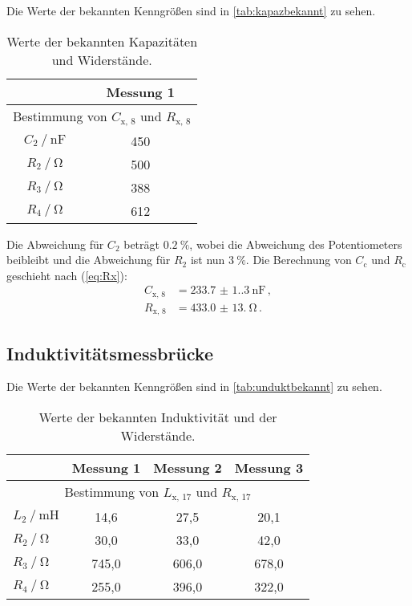 Die Werte der bekannten Kenngrößen sind in \autoref{tab:kapazbekannt} zu sehen.
\begin{table}
  \centering
  \caption{Werte der bekannten Kapazitäten und Widerstände.}
  \label{tab:kapazbekannt}
  \begin{tabular}{cc}
    \toprule
     & Messung 1  \\
    \midrule
    \multicolumn{2}{c}{ Bestimmung von $C_{\text{x, 8}}$ und $R_{\text{x, 8}}$ } \\
    $C_2 \mathbin{/} \unit{\nano\farad}$     & 450 \\
    $R_2 \mathbin{/} \unit{\ohm}$            & 500 \\
    $R_3 \mathbin{/} \unit{\ohm}$            & 388 \\
    $R_4 \mathbin{/} \unit{\ohm}$            & 612 \\
    \bottomrule
  \end{tabular}
\end{table}

Die Abweichung für $C_2$ beträgt $\qty{0.2}{\percent}$, wobei die Abweichung des Potentiometers beibleibt
und die Abweichung für $R_2$ ist nun $\qty{3}{\percent}$. 
Die Berechnung von $C_\text{c}$ und $R_\text{c}$ geschieht nach (\ref{eq:Rx}):
\begin{align*}
  C_\text{x, 8} &= \qty{233.7(1.3)}{\nano\farad} \, , \\
  R_\text{x, 8} &= \qty{433.0(13.0)}{\ohm} \, .
\end{align*}


\subsection{Induktivitätsmessbrücke} \label{sec:induktausw}

Die Werte der bekannten Kenngrößen sind in \autoref{tab:unduktbekannt} zu sehen.
\begin{table}
  \centering
  \caption{Werte der bekannten Induktivität und der Widerstände.}
  \label{tab:unduktbekannt}
  \begin{tabular}{lccc}
    \toprule
     & Messung 1 & Messung 2 & Messung 3  \\
    \midrule
    \multicolumn{4}{c}{ Bestimmung von $L_{\text{x, 17}}$ und $R_{\text{x, 17}}$ } \\
    $L_2 \mathbin{/} \unit{\milli\henry}$ &  14,6 &  27,5 &  20,1\\
    $R_2 \mathbin{/} \unit{\ohm}$         &  30,0 &  33,0 &  42,0\\
    $R_3 \mathbin{/} \unit{\ohm}$         & 745,0 & 606,0 & 678,0\\
    $R_4 \mathbin{/} \unit{\ohm}$         & 255,0 & 396,0 & 322,0\\
    \bottomrule
  \end{tabular}
\end{table}


